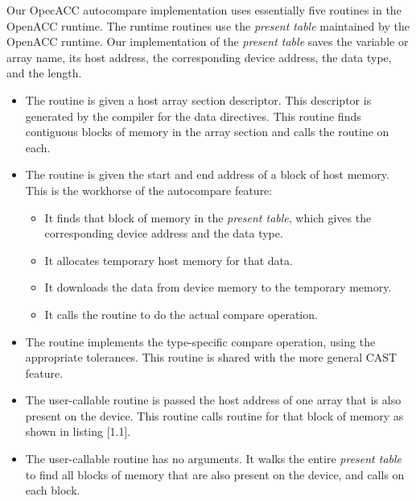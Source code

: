 Our OpecACC autocompare implementation uses essentially five routines in the OpenACC runtime.
The runtime routines use the \emph{present table}\cite{wolfe.ashes.17} maintained by the OpenACC runtime.
Our implementation of the \emph{present table} saves the variable or array name, its host address, the corresponding device address, the data type, and the length.
\begin{itemize}
\item The  routine is given a host array section descriptor.
This descriptor is generated by the compiler for the data directives.
This routine finds contiguous blocks of memory in the array section and calls the  routine on each.
\item The  routine is given the start and end address of a block of host memory.
This is the workhorse of the autocompare feature:
\begin{itemize}
\item It finds that block of memory in the \emph{present table}, which gives the corresponding device address and the data type.
\item It allocates temporary host memory for that data.
\item It downloads the data from device memory to the temporary memory.
\item It calls the  routine to do the actual compare operation.
\end{itemize}
\item The  routine implements the type-specific compare operation, using the appropriate tolerances.
This routine is shared with the more general CAST feature.

\item The user-callable  routine is passed the host address of one array that is also present on the device.
This routine calls  routine for that block of memory as shown in listing [1.1].
\item The user-callable  routine has no arguments.
It walks the entire \emph{present table} to find all blocks of memory that are also present on the device, and calls  on each block.
\end{itemize}

